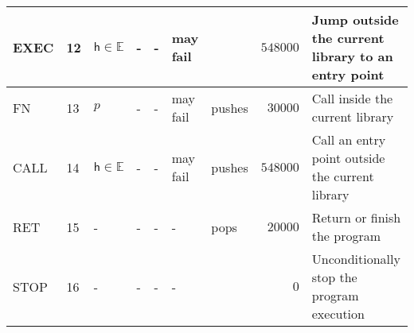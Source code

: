 \documentclass[9pt,oneside]{amsart}
\begin{document}
\begin{table}[h]
\begin{tabular}{l p{1cm} l p{1cm} p{1cm} p{1.5cm} p{1cm} r p{5cm}}
EXEC	&12	&$\mathsf{h} \in \mathbb{E}$ &-	&-                              &may fail	& 	    &$548000$ &Jump outside the current library to an entry point \\ \midrule
FN  	&13	&$p$	&-		        &-                              &may fail	&pushes &$30000$  &Call inside the current library \\ \midrule
CALL	&14	&$\mathsf{h} \in \mathbb{E}$	&-		        &-                              &may fail	&pushes	&$548000$ &Call an entry point outside the current library \\ \midrule
RET 	&15	&-  	&-		        &-                              &-	      	&pops   &$20000$  &Return or finish the program \\ \midrule
STOP	&16	&-  	&-		        &-                              &-	      	&       &$0$      &Unconditionally stop the program execution \\
\bottomrule
\end{tabular}
\end{table}



\newpage
\end{document}
